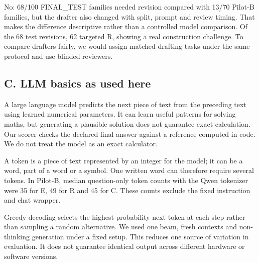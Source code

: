 \medskip{}\par\nopagebreak

No: 68/100 FINAL\_TEST families needed revision compared with 13/70 Pilot-B families, but the drafter also changed with split, prompt and review timing. That makes the difference descriptive rather than a controlled model comparison. Of the 68 test revisions, 62 targeted R, showing a real construction challenge. To compare drafters fairly, we would assign matched drafting tasks under the same protocol and use blinded reviewers.

\subsection*{C. LLM basics as used here}


\medskip{}\par\nopagebreak

A large language model predicts the next piece of text from the preceding text using learned numerical parameters. It can learn useful patterns for solving maths, but generating a plausible solution does not guarantee exact calculation. Our scorer checks the declared final answer against a reference computed in code. We do not treat the model as an exact calculator.

\medskip{}\par\nopagebreak

A token is a piece of text represented by an integer for the model; it can be a word, part of a word or a symbol. One written word can therefore require several tokens. In Pilot-B, median question-only token counts with the Qwen tokenizer were 35 for E, 49 for R and 45 for C. These counts exclude the fixed instruction and chat wrapper.

\medskip{}\par\nopagebreak

Greedy decoding selects the highest-probability next token at each step rather than sampling a random alternative. We used one beam, fresh contexts and non-thinking generation under a fixed setup. This reduces one source of variation in evaluation. It does not guarantee identical output across different hardware or software versions.

